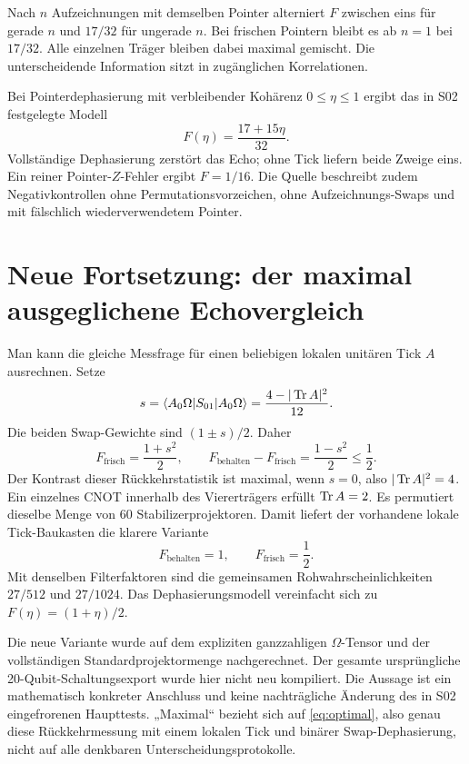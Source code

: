 Nach $n$ Aufzeichnungen mit demselben Pointer alterniert $F$ zwischen eins für gerade $n$ und $17/32$ für ungerade $n$. Bei frischen Pointern bleibt es ab $n=1$ bei $17/32$. Alle einzelnen Träger bleiben dabei maximal gemischt. Die unterscheidende Information sitzt in zugänglichen Korrelationen.

Bei Pointerdephasierung mit verbleibender Kohärenz $0\le\eta\le1$ ergibt das in S02 festgelegte Modell
\begin{equation}
F(\eta)=\frac{17+15\eta}{32}.
\end{equation}
Vollständige Dephasierung zerstört das Echo; ohne Tick liefern beide Zweige eins. Ein reiner Pointer-$Z$-Fehler ergibt $F=1/16$. Die Quelle beschreibt zudem Negativkontrollen ohne Permutationsvorzeichen, ohne Aufzeichnungs-Swaps und mit fälschlich wiederverwendetem Pointer.

\section{Neue Fortsetzung: der maximal ausgeglichene Echovergleich}
 Man kann die gleiche Messfrage für einen beliebigen lokalen unitären Tick $A$ ausrechnen. Setze
\begin{equation}
s=\langle A_0\Omega|S_{01}|A_0\Omega\rangle
=\frac{4-|\operatorname{Tr} A|^2}{12}.
\end{equation}
Die beiden Swap-Gewichte sind $(1\pm s)/2$. Daher
\begin{equation}
F_{\mathrm{frisch}}=\frac{1+s^2}{2},\qquad
F_{\mathrm{behalten}}-F_{\mathrm{frisch}}=\frac{1-s^2}{2}\le\frac12.
\label{eq:optimal}
\end{equation}
Der Kontrast dieser Rückkehrstatistik ist maximal, wenn $s=0$, also $|\operatorname{Tr} A|^2=4$. Ein einzelnes CNOT innerhalb des Viererträgers erfüllt $\operatorname{Tr} A=2$. Es permutiert dieselbe Menge von 60 Stabilizerprojektoren. Damit liefert der vorhandene lokale Tick-Baukasten die klarere Variante
\begin{equation}
\boxed{F_{\mathrm{behalten}}=1,\qquad F_{\mathrm{frisch}}=\frac12.}
\end{equation}
Mit denselben Filterfaktoren sind die gemeinsamen Rohwahrscheinlichkeiten $27/512$ und $27/1024$. Das Dephasierungsmodell vereinfacht sich zu $F(\eta)=(1+\eta)/2$.

Die neue Variante wurde auf dem expliziten ganzzahligen $\Omega$-Tensor und der vollständigen Standardprojektormenge nachgerechnet. Der gesamte ursprüngliche 20-Qubit-Schaltungsexport wurde hier nicht neu kompiliert. Die Aussage ist ein mathematisch konkreter Anschluss und keine nachträgliche Änderung des in S02 eingefrorenen Haupttests. „Maximal“ bezieht sich auf \eqref{eq:optimal}, also genau diese Rückkehrmessung mit einem lokalen Tick und binärer Swap-Dephasierung, nicht auf alle denkbaren Unterscheidungsprotokolle.

